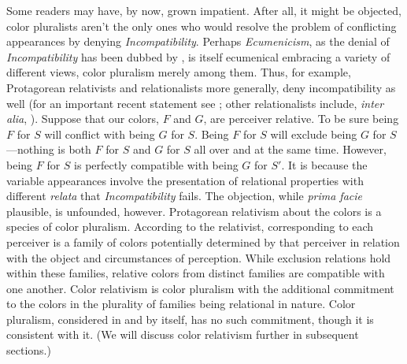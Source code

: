 \documentclass[12pt]{article}
\begin{document}
Some readers may have, by now, grown impatient. After all, it might be objected, color pluralists aren't the only ones who would resolve the problem of conflicting appearances by denying \emph{Incompatibility}. Perhaps \emph{Ecumenicism}, as the denial of \emph{Incompatibility} has been dubbed by \citet{Cohen:2009lq}, is itself ecumenical embracing a variety of different views, color pluralism merely among them. Thus, for example, Protagorean relativists and relationalists more generally, deny incompatibility as well (for an important recent statement see \citealt{Cohen:2009lq}; other relationalists include, \emph{inter alia}, \citealt{McGinn:1983kl,Thompson:1995fl,Matthen:1999ma,Cohen:2004ox,Matthen:2005md}). Suppose that our colors, \( F \) and \( G \), are perceiver relative. To be sure being \( F \) for \( S \) will conflict with being \( G \) for \( S \). Being \( F \) for \( S \) will exclude being \( G \) for \( S \)---nothing is both \( F \) for \( S \) and \( G \) for \( S \) all over and at the same time. However, being \( F \) for \( S \) is perfectly compatible with being \( G \) for \( S' \). It is because the variable appearances involve the presentation of relational properties with different \emph{relata} that \emph{Incompatibility} fails. The objection, while \emph{prima facie} plausible, is unfounded, however. Protagorean relativism about the colors is a species of color pluralism. According to the relativist, corresponding to each perceiver is a family of colors potentially determined by that perceiver in relation with the object and circumstances of perception. While exclusion relations hold within these families, relative colors from distinct families are compatible with one another. Color relativism is color pluralism with the additional commitment to the colors in the plurality of families being relational in nature. Color pluralism, considered in and by itself, has no such commitment, though it is consistent with it. (We will discuss color relativism further in subsequent sections.)
\end{document}
